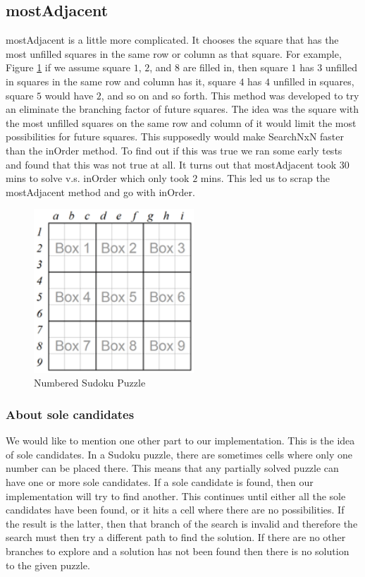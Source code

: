 \documentclass[letterpaper]{article}
\begin{document}
\subsection{mostAdjacent}
mostAdjacent is a little more complicated. It chooses the square that has the most unfilled squares in the same row or column as that square. For example, Figure \ref{fig:num-sudoku-puzzle} if we assume square $1$, $2$, and $8$ are filled in, then square $1$ has $3$ unfilled in squares in the same row and column has it, square $4$ has $4$ unfilled in squares, square $5$ would have $2$, and so on and so forth. This method was developed to try an eliminate the branching factor of future squares. The idea was the square with the most unfilled squares on the same row and column of it would limit the most possibilities for future squares. This supposedly would make SearchNxN faster than the inOrder method. To find out if this was true we ran some early tests and found that this was not true at all. It turns out that mostAdjacent took $30$ mins to solve v.s. inOrder which only took $2$ mins. This led us to scrap the mostAdjacent method and go with inOrder.

\begin{figure}[h]
	\centering
	\includegraphics[width=60mm]{./numBox.png}
	\caption{Numbered Sudoku Puzzle}
	\label{fig:num-sudoku-puzzle}
\end{figure}

\subsubsection{About sole candidates}
We would like to mention one other part to our implementation. This is the idea of sole candidates. In a Sudoku puzzle, there are sometimes cells where only one number can be placed there. This means that any partially solved puzzle can have one or more sole candidates. If a sole candidate is found, then our implementation will try to find another. This continues until either all the sole candidates have been found, or it hits a cell where there are no possibilities. If the result is the latter, then that branch of the search is invalid and therefore the search must then try a different path to find the solution. If there are no other branches to explore and a solution has not been found then there is no solution to the given puzzle.
\end{document}
